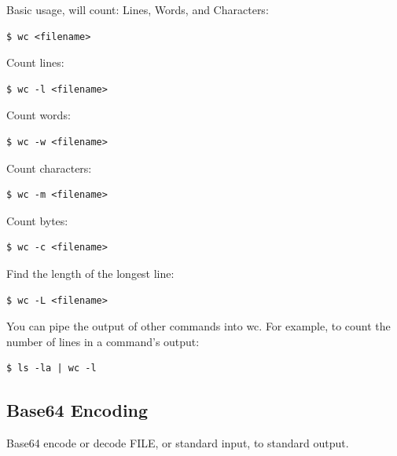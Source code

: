 \documentclass{article}
\newenvironment{codetemplate}[1][]{%
  \mybasecolorbox[#1]
  \itshape
}{%
  \endmybasecolorbox
}
\begin{document}
Basic usage, will count: Lines, Words, and Characters:
\begin{codetemplate}{}
\begin{verbatim}
$ wc <filename>
\end{verbatim}
\end{codetemplate}

Count lines:
\begin{codetemplate}{}
\begin{verbatim}
$ wc -l <filename>
\end{verbatim}
\end{codetemplate}

Count words:
\begin{codetemplate}{}
\begin{verbatim}
$ wc -w <filename>
\end{verbatim}
\end{codetemplate}

Count characters:
\begin{codetemplate}{}
\begin{verbatim}
$ wc -m <filename>
\end{verbatim}
\end{codetemplate}

Count bytes:
\begin{codetemplate}{}
\begin{verbatim}
$ wc -c <filename>
\end{verbatim}
\end{codetemplate}


Find the length of the longest line:
\begin{codetemplate}{}
\begin{verbatim}
$ wc -L <filename>
\end{verbatim}
\end{codetemplate}

You can pipe the output of other commands into wc. For example, to count the number of lines in a command's output:
\begin{codetemplate}{}
\begin{verbatim}
$ ls -la | wc -l
\end{verbatim}
\end{codetemplate}

\subsection{Base64 Encoding}

Base64 encode or decode FILE, or standard input, to standard output.
\end{document}
